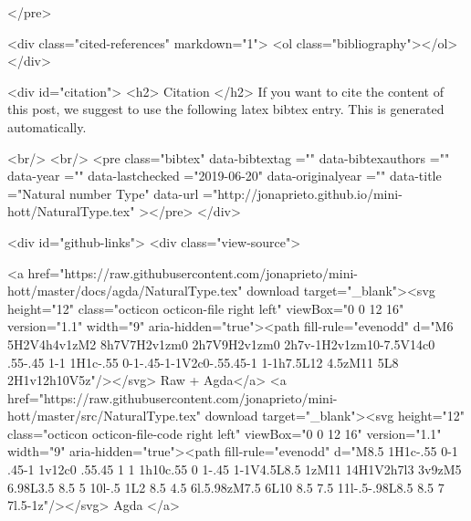 </pre>


  <div class="cited-references" markdown="1">
  <ol class="bibliography"></ol>
  </div>


  
  <div id="citation">
  <h2> Citation </h2>
  If you want to cite the content of this post,
  we suggest to use the following latex bibtex entry.
  This is generated automatically.

  <br/>
  <br/>
  <pre class="bibtex"
       data-bibtextag =""
       data-bibtexauthors =""
       data-year =""
       data-lastchecked ="2019-06-20"
       data-originalyear =""
       data-title ="Natural number Type"
       data-url ="http://jonaprieto.github.io/mini-hott/NaturalType.tex"
  ></pre>
  </div>
  

  <div id="github-links">
    <div class="view-source">
      
        <a href="https://raw.githubusercontent.com/jonaprieto/mini-hott/master/docs/agda/NaturalType.tex" download target="_blank"><svg height="12" class="octicon octicon-file right left" viewBox="0 0 12 16" version="1.1" width="9" aria-hidden="true"><path fill-rule="evenodd" d="M6 5H2V4h4v1zM2 8h7V7H2v1zm0 2h7V9H2v1zm0 2h7v-1H2v1zm10-7.5V14c0 .55-.45 1-1 1H1c-.55 0-1-.45-1-1V2c0-.55.45-1 1-1h7.5L12 4.5zM11 5L8 2H1v12h10V5z"/></svg> Raw + Agda</a>
        <a href="https://raw.githubusercontent.com/jonaprieto/mini-hott/master/src/NaturalType.tex" download target="_blank"><svg height="12" class="octicon octicon-file-code right left" viewBox="0 0 12 16" version="1.1" width="9" aria-hidden="true"><path fill-rule="evenodd" d="M8.5 1H1c-.55 0-1 .45-1 1v12c0 .55.45 1 1 1h10c.55 0 1-.45 1-1V4.5L8.5 1zM11 14H1V2h7l3 3v9zM5 6.98L3.5 8.5 5 10l-.5 1L2 8.5 4.5 6l.5.98zM7.5 6L10 8.5 7.5 11l-.5-.98L8.5 8.5 7 7l.5-1z"/></svg> Agda </a>
      
